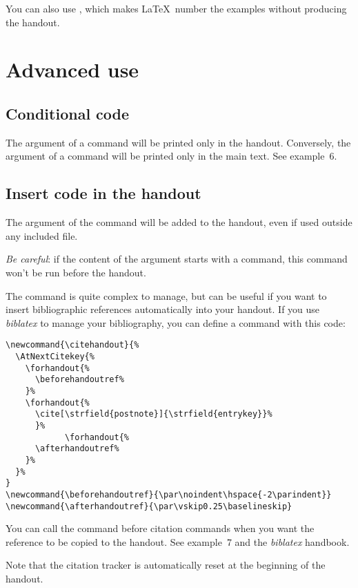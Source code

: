 \documentclass{ltxdockit}[2011/03/25]
\begin{document}
\label{printing} You can also use , which makes \LaTeX\ number the examples without producing the handout.

\section{Advanced use}
\subsection{Conditional code}

The argument of a   command will be printed only in the handout. Conversely, the argument of a command  will be printed only in the main text. See example~6.

\subsection{Insert code in the handout}

The argument of the   command will be added to the handout, even if used outside any included file.

\emph{Be careful}: if the content of the argument starts with a command, this command won't be run before the handout.

The  command is quite complex to manage, but can be useful if you want to insert bibliographic references automatically into your handout. If you use \emph{biblatex} to manage your bibliography, you can define a  command with this code:


\begin{verbatim}
\newcommand{\citehandout}{%
  \AtNextCitekey{%
    \forhandout{%
      \beforehandoutref%
    }%
    \forhandout{%
      \cite[\strfield{postnote}]{\strfield{entrykey}}%
      }%
            \forhandout{%
      \afterhandoutref%
    }%
  }%
}
\newcommand{\beforehandoutref}{\par\noindent\hspace{-2\parindent}}
\newcommand{\afterhandoutref}{\par\vskip0.25\baselineskip}
\end{verbatim}

You can call the  command before citation commands when you want the reference to be copied to the handout. See example~7 and the \emph{biblatex} handbook.


Note that the citation tracker is automatically reset at the beginning of the handout.
\end{document}
